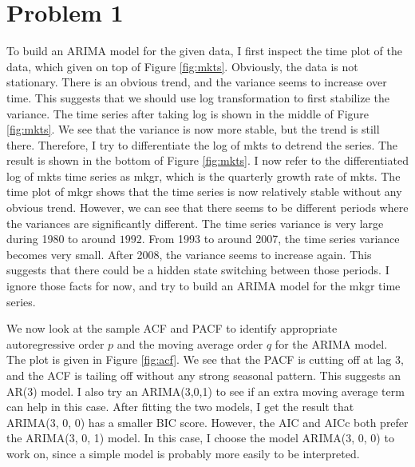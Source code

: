 \section{Problem 1}
To build an ARIMA model for the given data, I first inspect the time plot of the data, which given on top of Figure \ref{fig:mkts}. Obviously, the data is not stationary. There is an obvious trend, and the variance seems to increase over time. This suggests that we should use log transformation to first stabilize the variance. The time series after taking log is shown in the middle of Figure \ref{fig:mkts}. We see that the variance is now more stable, but the trend is still there. Therefore, I try to differentiate the log of mkts to detrend the series. The result is shown in the bottom of Figure \ref{fig:mkts}. I now refer to the differentiated log of mkts time series as mkgr, which is the quarterly growth rate of mkts. The time plot of mkgr shows that the time series is now relatively stable without any obvious trend. However, we can see that there seems to be different periods where the variances are significantly different. The time series variance is very large during 1980 to around $1992$. From 1993 to around 2007, the time series variance becomes very small. After 2008, the variance seems to increase again. This suggests that there could be a hidden state switching between those periods. I ignore those facts for now, and try to build an ARIMA model for the mkgr time series.

We now look at the sample ACF and PACF to identify appropriate autoregressive order $p$ and the moving average order $q$ for the ARIMA model. The plot is given in Figure \ref{fig:acf}. We see that the PACF is cutting off at lag 3, and the ACF is tailing off without any strong seasonal pattern. This suggests an AR(3) model. I also try an ARIMA(3,0,1) to see if an extra moving average term can help in this case. After fitting the two models, I get the result that ARIMA(3, 0, 0) has a smaller BIC score. However, the AIC and AICc both prefer the ARIMA(3, 0, 1) model. In this case, I choose the model ARIMA(3, 0, 0) to work on, since a simple model is probably more easily to be interpreted.

